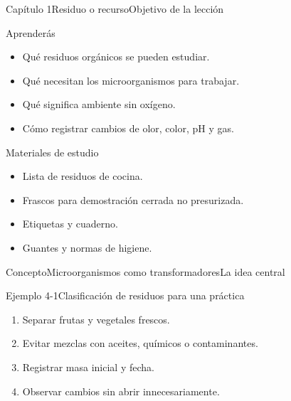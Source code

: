 \documentclass{../plantilla/hvtbook}
\begin{document}
\HVTMakeTitle
\begin{HVTPage}{Capítulo 1}{Residuo o recurso}{Objetivo de la lección}
\begin{HVTGrid}
\begin{HVTColumn}{Aprenderás}\begin{itemize}\item Qué residuos orgánicos se pueden estudiar. \item Qué necesitan los microorganismos para trabajar. \item Qué significa ambiente sin oxígeno. \item Cómo registrar cambios de olor, color, pH y gas.\end{itemize}\end{HVTColumn}
\begin{HVTColumn}{Materiales de estudio}\begin{itemize}\item Lista de residuos de cocina. \item Frascos para demostración cerrada no presurizada. \item Etiquetas y cuaderno. \item Guantes y normas de higiene.\end{itemize}\end{HVTColumn}
\end{HVTGrid}
\end{HVTPage}
\begin{HVTPage}{Concepto}{Microorganismos como transformadores}{La idea central}
\begin{HVTFlow}\end{HVTFlow}
\begin{HVTExample}{Ejemplo 4-1}{Clasificación de residuos para una práctica}\begin{enumerate}\item Separar frutas y vegetales frescos. \item Evitar mezclas con aceites, químicos o contaminantes. \item Registrar masa inicial y fecha. \item Observar cambios sin abrir innecesariamente.\end{enumerate}\end{HVTExample}
\end{HVTPage}
\end{document}
